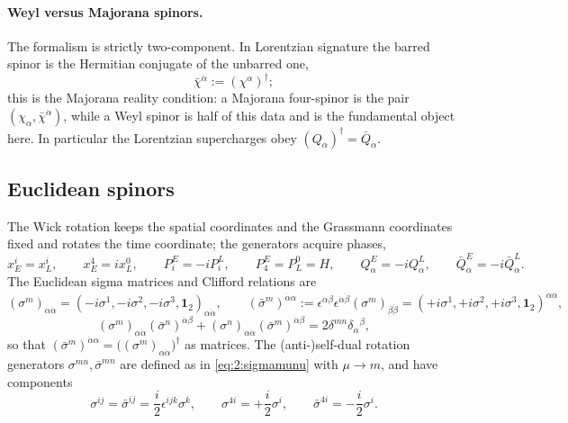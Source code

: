 \paragraph{Weyl versus Majorana spinors.} The formalism is strictly
two-component. In Lorentzian signature the barred spinor is the Hermitian
conjugate of the unbarred one,
\begin{equation}
\bar\chi^{\dot\alpha}:=(\chi^\alpha)^\dagger ;
\label{eq:2:majorana}
\end{equation}
this is the Majorana reality condition: a Majorana four-spinor is the pair
$(\chi_\alpha,\bar\chi^{\dot\alpha})$, while a Weyl spinor is half of this
data and is the fundamental object here. In particular the Lorentzian
supercharges obey $(Q_\alpha)^\dagger=\bar Q_{\dot\alpha}$.

\subsection{Euclidean spinors}\label{sec:notation:euclidean}

The Wick rotation keeps the spatial coordinates and the Grassmann coordinates
fixed and rotates the time coordinate; the generators acquire phases,
\begin{equation}
x_E^i=x_L^i,\qquad x_E^4=ix_L^0,\qquad
P^E_i=-iP^L_i,\qquad P^E_4=P_L^0=H,\qquad
Q^E_\alpha=-iQ^L_\alpha,\qquad
\bar Q^E_{\dot\alpha}=-i\bar Q^L_{\dot\alpha} .
\label{eq:2:wick}
\end{equation}
The Euclidean sigma matrices and Clifford relations are
\begin{equation}
(\sigma^m)_{\alpha\dot\alpha}
=(-i\sigma^1,-i\sigma^2,-i\sigma^3,\mathbf 1_2)_{\alpha\dot\alpha},\qquad
(\bar\sigma^m)^{\dot\alpha\alpha}
:=\epsilon^{\alpha\beta}\epsilon^{\dot\alpha\dot\beta}
(\sigma^m)_{\beta\dot\beta}
=(+i\sigma^1,+i\sigma^2,+i\sigma^3,\mathbf 1_2)^{\dot\alpha\alpha},
\label{eq:2:sigmaE}
\end{equation}
\begin{equation}
(\sigma^m)_{\alpha\dot\alpha}(\bar\sigma^n)^{\dot\alpha\beta}
+(\sigma^n)_{\alpha\dot\alpha}(\bar\sigma^m)^{\dot\alpha\beta}
=2\delta^{mn}\delta_\alpha{}^\beta ,
\label{eq:2:cliffordE}
\end{equation}
so that $(\bar\sigma^m)^{\dot\alpha\alpha}
=\big((\sigma^m)_{\alpha\dot\alpha}\big)^\dagger$ as matrices. The
(anti-)self-dual rotation generators $\sigma^{mn},\bar\sigma^{mn}$ are defined
as in \eqref{eq:2:sigmamunu} with $\mu\to m$, and have components
\begin{equation}
\sigma^{ij}=\bar\sigma^{ij}=\frac{i}{2}\epsilon^{ijk}\sigma^k,\qquad
\sigma^{4i}=+\frac{i}{2}\sigma^i,\qquad
\bar\sigma^{4i}=-\frac{i}{2}\sigma^i .
\label{eq:2:sigmamn}
\end{equation}

